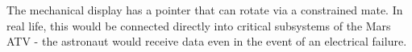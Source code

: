 The mechanical display has a pointer that can rotate via a constrained mate. In real life, this would be connected directly into critical subsystems of the Mars ATV - the astronaut would receive data even in the event of an electrical failure.
